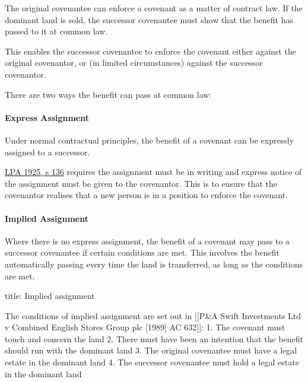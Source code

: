 \documentclass[
]{article}
\newenvironment{Shaded}{}{}
\newcommand{\NormalTok}[1]{#1}
\begin{document}
The original covenantee can enforce a covenant as a matter of contract
law. If the dominant land is sold, the successor covenantee must show
that the benefit has passed to it at common law.

This enables the successor covenantee to enforce the covenant either
against the original covenantor, or (in limited circumstances) against
the successor covenantor.

There are two ways the benefit can pass at common law:

\hypertarget{express-assignment}{%
\paragraph{Express Assignment}\label{express-assignment}}

Under normal contractual principles, the benefit of a covenant can be
expressly assigned to a successor.

\href{https://www.legislation.gov.uk/ukpga/Geo5/15-16/20/section/136}{LPA
1925, s 136} requires the assignment must be in writing and express
notice of the assignment must be given to the covenantor. This is to
ensure that the covenantor realises that a new person is in a position
to enforce the covenant.

\hypertarget{implied-assignment}{%
\paragraph{Implied Assignment}\label{implied-assignment}}

Where there is no express assignment, the benefit of a covenant may pass
to a successor covenantee if certain conditions are met. This involves
the benefit automatically passing every time the land is transferred, as
long as the conditions are met.

\begin{Shaded}
\begin{Highlighting}[]
\NormalTok{title: Implied assignment}

\NormalTok{The conditions of implied assignment are set out in [[P\&A Swift Investments Ltd v Combined English Stores Group plc [1989] AC 632]]:}
\NormalTok{1. The covenant must touch and concern the land}
\NormalTok{2. There must have been an intention that the benefit should run with the dominant land}
\NormalTok{3. The original covenantee must have a legal estate in the dominant land}
\NormalTok{4. The successor covenantee must hold a legal estate in the dominant land}
\end{Highlighting}
\end{Shaded}
\end{document}
